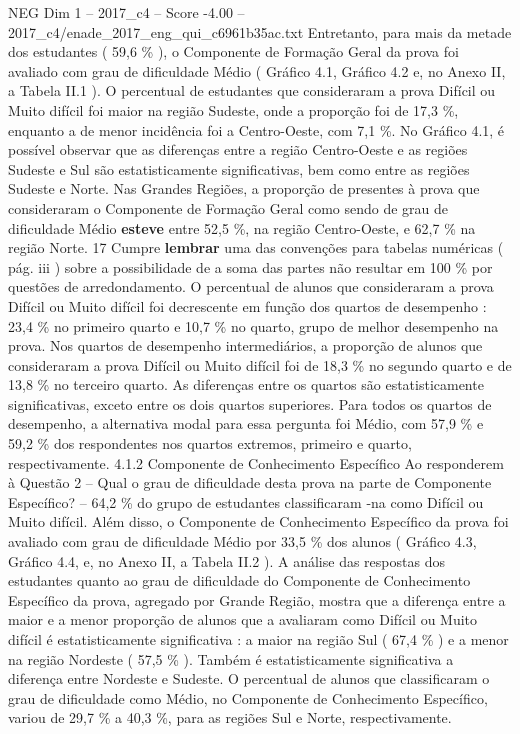 \begin{textsample}{NEG Dim 1 – 2017\_c4 – Score -4.00 – 2017\_c4/enade\_2017\_eng\_qui\_c6961b35ac.txt}
Entretanto, para mais da metade dos estudantes ( 59,6 \% ), o Componente de Formação Geral da prova foi avaliado com grau de dificuldade Médio ( Gráfico 4.1, Gráfico 4.2 e, no Anexo II, a Tabela II.1 ).
O percentual de estudantes que consideraram a prova Difícil ou Muito difícil foi maior na região Sudeste, onde a proporção foi de 17,3 \%, enquanto a de menor incidência foi a Centro-Oeste, com 7,1 \%.
No Gráfico 4.1, é possível observar que as diferenças entre a região Centro-Oeste e as regiões Sudeste e Sul são estatisticamente significativas, bem como entre as regiões Sudeste e Norte.
Nas Grandes Regiões, a proporção de presentes à prova que consideraram o Componente de Formação Geral como sendo de grau de dificuldade Médio \textbf{esteve} entre 52,5 \%, na região Centro-Oeste, e 62,7 \% na região Norte. 17 Cumpre \textbf{lembrar} uma das convenções para tabelas numéricas ( pág. iii ) sobre a possibilidade de a soma das partes não resultar em 100 \% por questões de arredondamento.
O percentual de alunos que consideraram a prova Difícil ou Muito difícil foi decrescente em função dos quartos de desempenho : 23,4 \% no primeiro quarto e 10,7 \% no quarto, grupo de melhor desempenho na prova.
Nos quartos de desempenho intermediários, a proporção de alunos que consideraram a prova Difícil ou Muito difícil foi de 18,3 \% no segundo quarto e de 13,8 \% no terceiro quarto.
As diferenças entre os quartos são estatisticamente significativas, exceto entre os dois quartos superiores.
Para todos os quartos de desempenho, a alternativa modal para essa pergunta foi Médio, com 57,9 \% e 59,2 \% dos respondentes nos quartos extremos, primeiro e quarto, respectivamente. 4.1.2 Componente de Conhecimento Específico Ao responderem à Questão 2 – Qual o grau de dificuldade desta prova na parte de Componente Específico? – 64,2 \% do grupo de estudantes classificaram -na como Difícil ou Muito difícil.
Além disso, o Componente de Conhecimento Específico da prova foi avaliado com grau de dificuldade Médio por 33,5 \% dos alunos ( Gráfico 4.3, Gráfico 4.4, e, no Anexo II, a Tabela II.2 ).
A análise das respostas dos estudantes quanto ao grau de dificuldade do Componente de Conhecimento Específico da prova, agregado por Grande Região, mostra que a diferença entre a maior e a menor proporção de alunos que a avaliaram como Difícil ou Muito difícil é estatisticamente significativa : a maior na região Sul ( 67,4 \% ) e a menor na região Nordeste ( 57,5 \% ).
Também é estatisticamente significativa a diferença entre Nordeste e Sudeste.
O percentual de alunos que classificaram o grau de dificuldade como Médio, no Componente de Conhecimento Específico, variou de 29,7 \% a 40,3 \%, para as regiões Sul e Norte, respectivamente.

\end{textsample}
